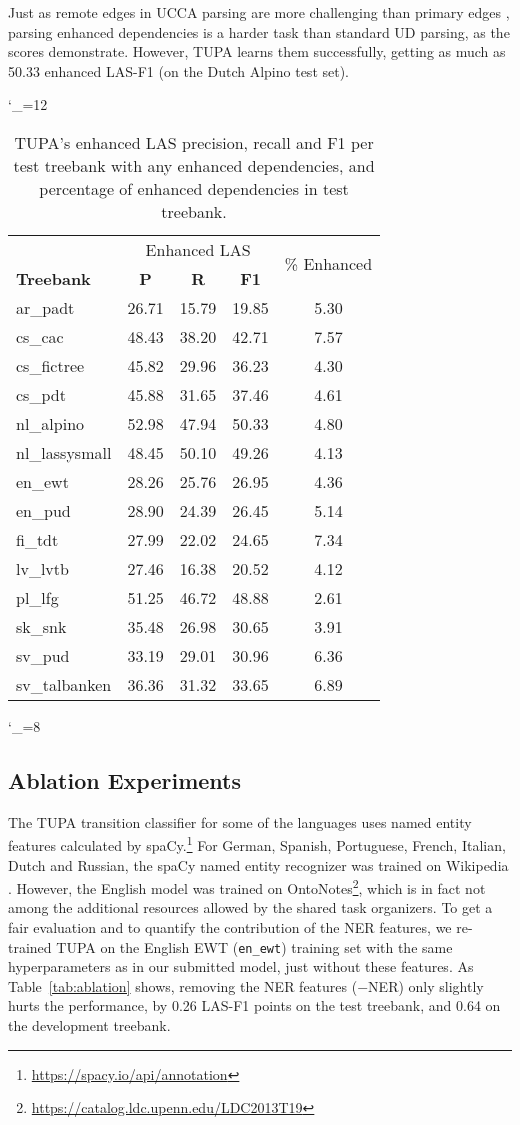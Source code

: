 \documentclass[11pt,a4paper]{article}
\begin{document}
Just as remote edges in UCCA parsing are more challenging
than primary edges \cite{hershcovich2017a},
parsing enhanced dependencies is a harder task than standard UD parsing,
as the scores demonstrate.
However, TUPA learns them successfully, getting as much as 50.33 enhanced LAS-F1
(on the Dutch Alpino test set).

\catcode`\_=12
\begin{table}[t]
\begin{tabular}{l|ccc|c}
\hline
& \multicolumn{3}{c|}{Enhanced LAS} & \multirow{2}{11mm}{\% Enhanced} \\
\bf Treebank & \bf P & \bf R & \bf F1 & \\
\hline
ar_padt & 26.71 & 15.79 & 19.85 & 5.30\\
cs_cac & 48.43 & 38.20 & 42.71 & 7.57\\
cs_fictree & 45.82 & 29.96 & 36.23 & 4.30\\
cs_pdt & 45.88 & 31.65 & 37.46 & 4.61\\
nl_alpino & 52.98 & 47.94 & 50.33 & 4.80\\
nl_lassysmall & 48.45 & 50.10 & 49.26 & 4.13\\
en_ewt & 28.26 & 25.76 & 26.95 & 4.36\\
en_pud & 28.90 & 24.39 & 26.45 & 5.14\\
fi_tdt & 27.99 & 22.02 & 24.65 & 7.34\\
lv_lvtb & 27.46 & 16.38 & 20.52 & 4.12\\
pl_lfg & 51.25 & 46.72 & 48.88 & 2.61\\
sk_snk & 35.48 & 26.98 & 30.65 & 3.91\\
sv_pud & 33.19 & 29.01 & 30.96 & 6.36\\
sv_talbanken & 36.36 & 31.32 & 33.65 & 6.89
\end{tabular}
\caption{TUPA's enhanced LAS precision, recall and F1 per test treebank with 
any enhanced dependencies,
and percentage of enhanced dependencies in test treebank.
\label{tab:enhanced}}
\end{table}
\catcode`\_=8

\subsection{Ablation Experiments}\label{sec:ablation}

The TUPA transition classifier for some of the languages uses
named entity features calculated by
spaCy.\footnote{\url{https://spacy.io/api/annotation}}
For German, Spanish, Portuguese, French, Italian, Dutch and Russian,
the spaCy named entity recognizer was trained
on Wikipedia \cite{nothman2013learning}.
However, the English model was trained on
OntoNotes\footnote{\url{https://catalog.ldc.upenn.edu/LDC2013T19}},
which is in fact not among the additional resources allowed by the shared task
organizers.
To get a fair evaluation
and to quantify the contribution of the NER features,
we re-trained TUPA on the English EWT (\verb|en_ewt|) training set
with the same hyperparameters as in our submitted model,
just without these features.
As Table~\ref{tab:ablation} shows,
removing the NER features ($-$NER) only slightly hurts the performance,
by 0.26 LAS-F1 points on the test treebank,
and 0.64 on the development treebank. 
\end{document}
